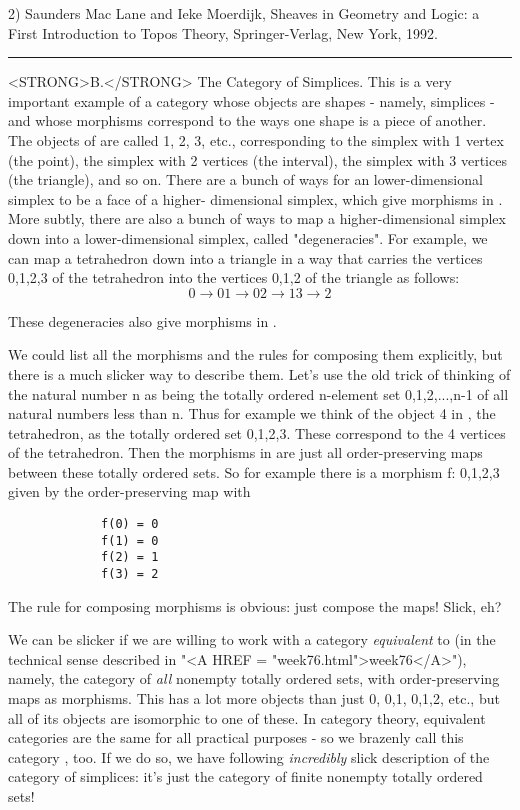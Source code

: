 2) Saunders Mac Lane and Ieke Moerdijk, Sheaves in Geometry and Logic: 
a First Introduction to Topos Theory, Springer-Verlag, New York, 1992.
\par\noindent\rule{\textwidth}{0.4pt}
<STRONG>B.</STRONG>  The Category of Simplices.  This is a very important example
of a category whose objects are shapes - namely, simplices - and
whose morphisms correspond to the ways one shape is a piece of another.
The objects of \Delta  are called 1, 2, 3, etc., corresponding to the
simplex with 1 vertex (the point), the simplex with 2 vertices (the
interval), the simplex with 3 vertices (the triangle), and so on.  There
are a bunch of ways for an lower-dimensional simplex to be a face of a
higher- dimensional simplex, which give morphisms in \Delta .  More
subtly, there are also a bunch of ways to map a higher-dimensional
simplex down into a lower-dimensional simplex, called "degeneracies".
For example, we can map a tetrahedron down into a triangle in a way that
carries the vertices {0,1,2,3} of the tetrahedron into the vertices
{0,1,2} of the triangle as follows:
$$
             0 \to  0
             1 \to  0
             2 \to  1
             3 \to  2

$$
    
These degeneracies also give morphisms in \Delta .  

We could list all the morphisms and the rules for composing them
explicitly, but there is a much slicker way to describe them.  Let's use
the old trick of thinking of the natural number n as being the totally
ordered n-element set {0,1,2,...,n-1} of all natural numbers less than
n.  Thus for example we think of the object 4 in \Delta , the tetrahedron,
as the totally ordered set {0,1,2,3}.  These correspond to the 4
vertices of the tetrahedron.  Then the morphisms in \Delta  are just all
order-preserving maps between these totally ordered sets.  So for
example there is a morphism f: {0,1,2,3}  given by the
order-preserving map with

\begin{verbatim}
             f(0) = 0
             f(1) = 0
             f(2) = 1
             f(3) = 2

\end{verbatim}
    
The rule for composing morphisms is obvious: just compose the maps!
Slick, eh?  

We can be slicker if we are willing to work with a category \emph{equivalent}
to \Delta  (in the technical sense described in "<A HREF = "week76.html">week76</A>"), namely, the
category of \emph{all} nonempty totally ordered sets, with order-preserving
maps as morphisms.  This has a lot more objects than just {0}, {0,1},
{0,1,2}, etc., but all of its objects are isomorphic to one of these.
In category theory, equivalent categories are the same for all practical
purposes - so we brazenly call this category \Delta , too.  If we do
so, we have following \emph{incredibly} slick description of the category
of simplices: it's just the category of finite nonempty totally ordered
sets!

